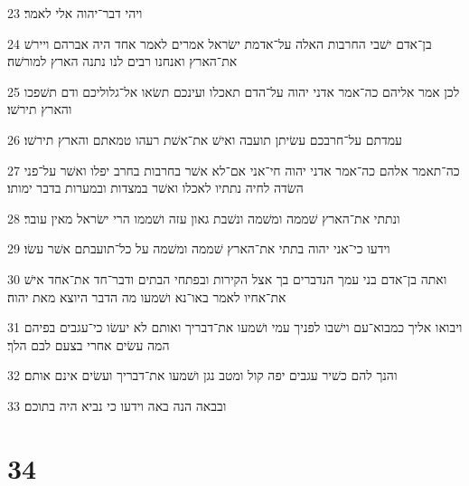 \par 23 ויהי דבר־יהוה אלי לאמר׃
\par 24 בן־אדם ישׁבי החרבות האלה על־אדמת ישׂראל אמרים לאמר אחד היה אברהם ויירשׁ את־הארץ ואנחנו רבים לנו נתנה הארץ למורשׁה׃
\par 25 לכן אמר אליהם כה־אמר אדני יהוה על־הדם תאכלו ועינכם תשׂאו אל־גלוליכם ודם תשׁפכו והארץ תירשׁו׃
\par 26 עמדתם על־חרבכם עשׂיתן תועבה ואישׁ את־אשׁת רעהו טמאתם והארץ תירשׁו׃
\par 27 כה־תאמר אלהם כה־אמר אדני יהוה חי־אני אם־לא אשׁר בחרבות בחרב יפלו ואשׁר על־פני השׂדה לחיה נתתיו לאכלו ואשׁר במצדות ובמערות בדבר ימותו׃
\par 28 ונתתי את־הארץ שׁממה ומשׁמה ונשׁבת גאון עזה ושׁממו הרי ישׂראל מאין עובר׃
\par 29 וידעו כי־אני יהוה בתתי את־הארץ שׁממה ומשׁמה על כל־תועבתם אשׁר עשׂו׃
\par 30 ואתה בן־אדם בני עמך הנדברים בך אצל הקירות ובפתחי הבתים ודבר־חד את־אחד אישׁ את־אחיו לאמר באו־נא ושׁמעו מה הדבר היוצא מאת יהוה׃
\par 31 ויבואו אליך כמבוא־עם וישׁבו לפניך עמי ושׁמעו את־דבריך ואותם לא יעשׂו כי־עגבים בפיהם המה עשׂים אחרי בצעם לבם הלך׃
\par 32 והנך להם כשׁיר עגבים יפה קול ומטב נגן ושׁמעו את־דבריך ועשׂים אינם אותם׃
\par 33 ובבאה הנה באה וידעו כי נביא היה בתוכם׃

\chapter{34}

